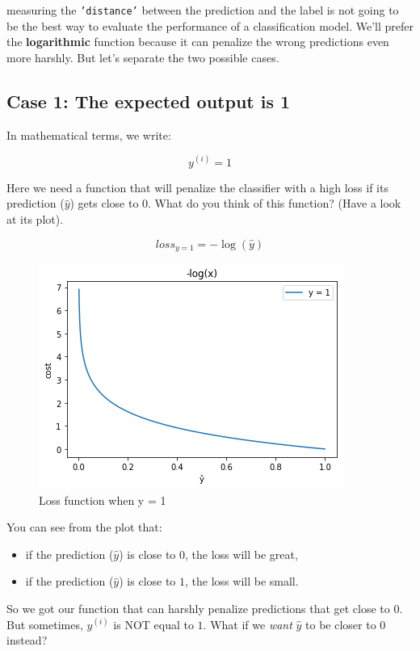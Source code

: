 measuring the \texttt{'distance'} between the prediction and the label is not going to be the best way to evaluate the performance of a classification  model.
We'll prefer the \textbf{logarithmic} function because it can penalize the wrong predictions even more harshly.
But let's separate the two possible cases.

\newpage

\subsection*{Case 1: The expected output is 1}
In mathematical terms, we write:

$$
y^{(i)} = 1
$$  

Here we need a function that will penalize the classifier with a high loss if its prediction ($\hat{y}$) gets close to $0$.
What do you think of this function? (Have a look at its plot).

$$
loss_{y=1} = -\log(\hat{y})
$$

\begin{figure}[!h]
    \centering
    \includegraphics[scale=0.55]{assets/-log_x.png}
    \caption{Loss function when y = 1}
\end{figure}


You can see from the plot that:
\begin{itemize}
    \item if the prediction ($\hat{y}$) is close to $0$, the loss will be great, 
    \item if the prediction ($\hat{y}$) is close to $1$, the loss will be small.  
\end{itemize}


So we got our function that can harshly penalize predictions that get close to $0$.
But sometimes, $y^{(i)}$ is NOT equal to $1$.
What if we \textit{want} $\hat{y}$ to be closer to $0$ instead?

